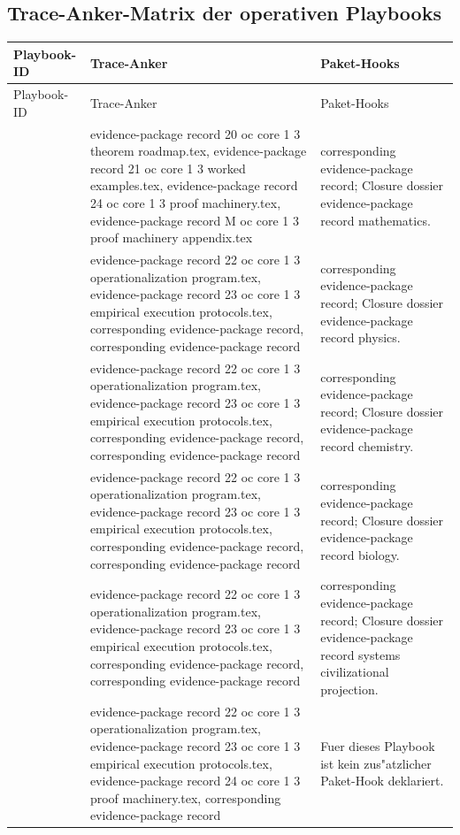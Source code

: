 \subsection{Trace-Anker-Matrix der operativen Playbooks}
\begin{longtable}{@{}L{0.16\textwidth}L{0.38\textwidth}L{0.34\textwidth}@{}}
\toprule
Playbook-ID & Trace-Anker & Paket-Hooks \\
\midrule
\endfirsthead
\toprule
Playbook-ID & Trace-Anker & Paket-Hooks \\
\midrule
\endhead
{} & evidence-package record 20 oc core 1 3 theorem roadmap.tex, \allowbreak evidence-package record 21 oc core 1 3 worked examples.tex, \allowbreak evidence-package record 24 oc core 1 3 proof machinery.tex, \allowbreak evidence-package record M oc core 1 3 proof machinery appendix.tex & corresponding evidence-package record; Closure dossier evidence-package record mathematics. \\
 & evidence-package record 22 oc core 1 3 operationalization program.tex, \allowbreak evidence-package record 23 oc core 1 3 empirical execution protocols.tex, corresponding evidence-package record, corresponding evidence-package record & corresponding evidence-package record; Closure dossier evidence-package record physics. \\
 & evidence-package record 22 oc core 1 3 operationalization program.tex, \allowbreak evidence-package record 23 oc core 1 3 empirical execution protocols.tex, corresponding evidence-package record, corresponding evidence-package record & corresponding evidence-package record; Closure dossier evidence-package record chemistry. \\
 & evidence-package record 22 oc core 1 3 operationalization program.tex, \allowbreak evidence-package record 23 oc core 1 3 empirical execution protocols.tex, corresponding evidence-package record, corresponding evidence-package record & corresponding evidence-package record; Closure dossier evidence-package record biology. \\
 & evidence-package record 22 oc core 1 3 operationalization program.tex, \allowbreak evidence-package record 23 oc core 1 3 empirical execution protocols.tex, corresponding evidence-package record, corresponding evidence-package record & corresponding evidence-package record; Closure dossier evidence-package record systems civilizational projection. \\
 & evidence-package record 22 oc core 1 3 operationalization program.tex, \allowbreak evidence-package record 23 oc core 1 3 empirical execution protocols.tex, \allowbreak evidence-package record 24 oc core 1 3 proof machinery.tex, corresponding evidence-package record & Fuer dieses Playbook ist kein zus"atzlicher Paket-Hook deklariert. \\
\bottomrule
\end{longtable}
